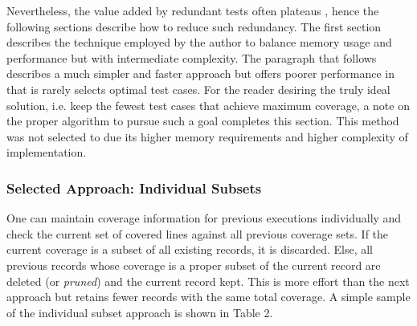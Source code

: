 Nevertheless, the value added by redundant tests often plateaus 
\cite{lemieux2023codamosa}, hence the following sections
describe how to reduce such redundancy.  The first section describes
the technique employed by the author to balance memory usage and performance but
with intermediate complexity. The paragraph that follows describes a much simpler and faster
approach but offers poorer performance in that is rarely selects optimal test 
cases.  For the reader desiring the truly ideal solution, i.e. keep the fewest test cases that achieve
maximum coverage, a note on the proper algorithm to pursue such a goal completes
this section. This method was not selected to due its higher memory
requirements and higher complexity of implementation.
 
\subsubsection{Selected Approach: Individual Subsets}\label{sec:tuning-2}
One can maintain coverage information for previous
executions individually and check the current set of covered lines
against all previous coverage sets.  If the current coverage is
a subset of all existing records, it is discarded.  
Else, all previous records whose coverage is 
a proper subset of the current record are deleted (or \textit{pruned})
and the current record kept. This is more effort than the next approach but
retains fewer records with the same total coverage.  
A simple sample of the individual subset approach is shown in Table 2.

